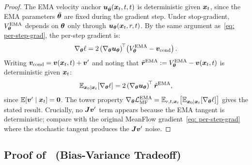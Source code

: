 \begin{appendices}
    \begin{proof}
        The EMA velocity anchor ${\bm{u}}_{\bar{{\bm{\theta}}}}({\bm{x}}_{t},t,t)$ is deterministic given ${\bm{x}}_{t}$, since the EMA parameters $\bar{{\bm{\theta}}}$ are fixed during the gradient step. Under stop-gradient, $V_{{\bm{\theta}}}^{\text{EMA}}$ depends on ${\bm{\theta}}$ only through ${\bm{u}}_{{\bm{\theta}}}({\bm{x}}_{t},r,t)$. By the same argument as~\eqref{eq: per-step-grad}, the per-step gradient is:
        \begin{equation}
            \nabla_{{\bm{\theta}}}\ell=2\left(\nabla_{{\bm{\theta}}}{\bm{u}}_{{\bm{\theta}}}\right)^{\!\top}\!\left(V_{{\bm{\theta}}}^{\text{EMA}}-{\bm{v}}_{\text{cond}}\right).
        \end{equation}
        Writing ${\bm{v}}_{\text{cond}}={\bm{v}}({\bm{x}}_{t},t)+{\bm{v}}^{\prime}$ and noting that $\tilde{{\bm{r}}}^{\text{EMA}}:=V_{{\bm{\theta}}}^{\text{EMA}}-{\bm{v}}({\bm{x}}_{t},t)$ is deterministic given ${\bm{x}}_{t}$:
        \begin{equation}
            \mathbb{E}_{{\bm{x}}_{0}\mid{\bm{x}}_{t}}\!\left[\nabla_{{\bm{\theta}}}\ell\right]=2\left(\nabla_{{\bm{\theta}}}{\bm{u}}_{{\bm{\theta}}}\right)^{\!\top}\tilde{{\bm{r}}}^{\text{EMA}},
        \end{equation}
        since $\mathbb{E}[{\bm{v}}^{\prime}\mid{\bm{x}}_{t}]=\bm{0}$. The tower property $\nabla_{{\bm{\theta}}}{\mathcal{L}}_{\text{MF}}^{\text{EMA}}=\mathbb{E}_{r,t,{\bm{x}}_{t}}\!\left[\mathbb{E}_{{\bm{x}}_{0}\mid{\bm{x}}_{t}}[\nabla_{{\bm{\theta}}}\ell]\right]$ gives the stated result. Crucially, no ${\bm{J}}{\bm{v}}^{\prime}$ term appears because the EMA tangent is deterministic; compare with the original MeanFlow gradient~\eqref{eq: per-step-grad} where the stochastic tangent produces the ${\bm{J}}{\bm{v}}^{\prime}$ noise.
    \end{proof}

    \subsection{Proof of~ (Bias-Variance Tradeoff)}



\end{appendices}
